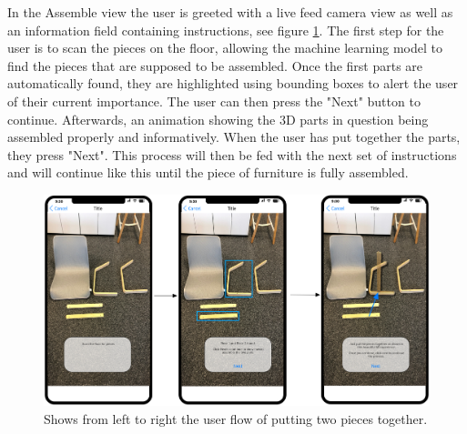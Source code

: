 In the Assemble view the user is greeted with a live feed camera view as well as an information field containing instructions, see figure \ref{fig:assemble-view}. The first step for the user is to scan the pieces on the floor, allowing the machine learning model to find the pieces that are supposed to be assembled. Once the first parts are automatically found, they are highlighted using bounding boxes to alert the user of their current importance. The user can then press the "Next" button to continue. Afterwards, an animation showing the 3D parts in question being assembled properly and informatively. When the user has put together the parts, they press "Next". This process will then be fed with the next set of instructions and will continue like this until the	 piece of furniture is fully assembled.
\begin{figure}[hbtp]
\begin{center}
\includegraphics[height = 0.35\textheight]{./Images/AR_Scene.png}
\caption{Shows from left to right the user flow of putting two pieces together.}
\label{fig:assemble-view}
\end{center}
\end{figure}

\newpage